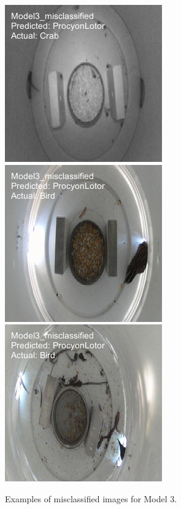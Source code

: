 \documentclass[a4paper,12pt]{article}
\begin{document}
\begin{figure}[H]
    \centering
    \includegraphics[width=0.3\linewidth]{results/Model3_misclassified_image_51.png}
    \includegraphics[width=0.3\linewidth]{results/Model3_misclassified_image_82.png}
    \includegraphics[width=0.3\linewidth]{results/Model3_misclassified_image_158.png}
    \caption{Examples of misclassified images for Model 3.}
\end{figure}
\end{document}

